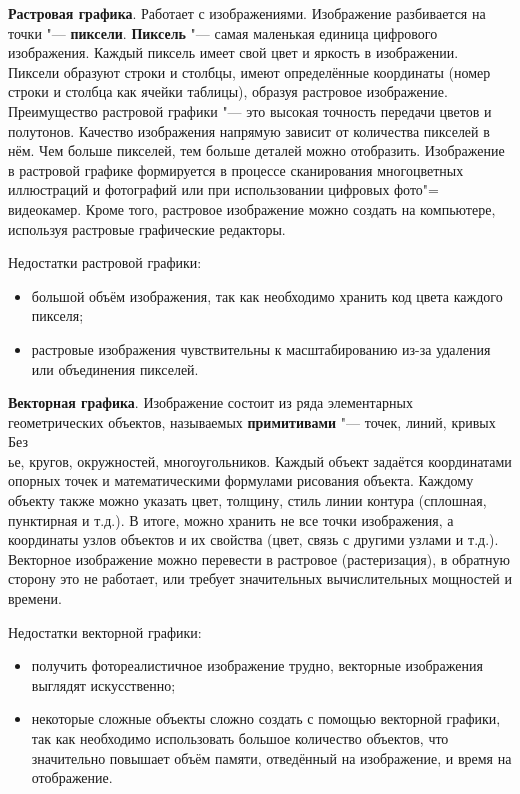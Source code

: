 \textbf{Растровая графика}. Работает с изображениями. Изображение разбивается на точки "--- \textbf{пиксели}. \textbf{Пиксель} "--- самая маленькая единица цифрового изображения. Каждый пиксель имеет свой цвет и яркость в изображении. Пиксели образуют строки и столбцы, имеют определённые координаты (номер строки и столбца как ячейки таблицы), образуя растровое изображение. Преимущество растровой графики "--- это высокая точность передачи цветов и полутонов. Качество изображения напрямую зависит от количества пикселей в нём. Чем больше пикселей, тем больше деталей можно отобразить. Изображение в растровой графике формируется в процессе сканирования многоцветных иллюстраций и фотографий или при использовании цифровых фото"= видеокамер. Кроме того, растровое изображение можно создать на компьютере, используя растровые графические редакторы\cite{burceva2023cg}.

Недостатки растровой графики:
\begin{itemize}
    \item большой объём изображения, так как необходимо хранить код цвета каждого пикселя;
    \item растровые изображения чувствительны к масштабированию из-за удаления или объединения пикселей.
\end{itemize}

\textbf{Векторная графика}. Изображение состоит из ряда элементарных геометрических объектов, называемых \textbf{примитивами} "--- точек, линий, кривых Без\\ье, кругов, окружностей, многоугольников. Каждый объект задаётся координатами опорных точек и математическими формулами рисования объекта. Каждому объекту также можно указать цвет, толщину, стиль линии контура (сплошная, пунктирная и т.д.). В итоге, можно хранить не все точки изображения, а координаты узлов объектов и их свойства (цвет, связь с другими узлами и т.д.). Векторное изображение можно перевести в растровое (растеризация), в обратную сторону это не работает, или требует значительных вычислительных мощностей и времени\cite{burceva2023cg}.

Недостатки векторной графики:
\begin{itemize}
    \item получить фотореалистичное изображение трудно, векторные изображения выглядят искусственно;
    \item некоторые сложные объекты сложно создать с помощью векторной графики, так как необходимо использовать большое количество объектов, что значительно повышает объём памяти, отведённый на изображение, и время на отображение.
\end{itemize}

